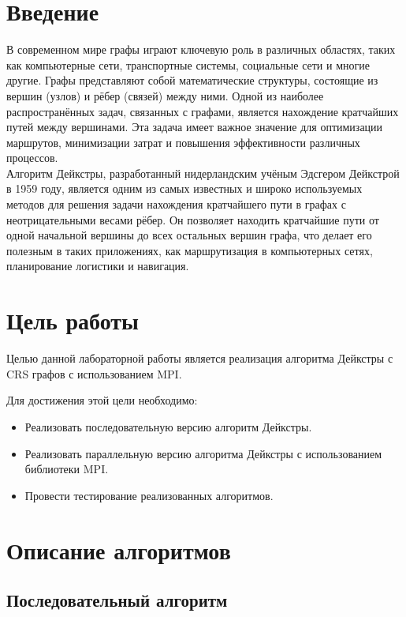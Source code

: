 \documentclass[a4paper, 14pt]{extarticle}
\begin{document}
    \tableofcontents

    \newpage
    \section{Введение}
В современном мире графы играют ключевую роль в различных областях, таких как компьютерные сети, транспортные системы, социальные сети и многие другие. Графы представляют собой математические структуры, состоящие из вершин (узлов) и рёбер (связей) между ними. Одной из наиболее распространённых задач, связанных с графами, является нахождение кратчайших путей между вершинами. Эта задача имеет важное значение для оптимизации маршрутов, минимизации затрат и повышения эффективности различных процессов.\\

Алгоритм Дейкстры, разработанный нидерландским учёным Эдсгером Дейкстрой в 1959 году, является одним из самых известных и широко используемых методов для решения задачи нахождения кратчайшего пути в графах с неотрицательными весами рёбер. Он позволяет находить кратчайшие пути от одной начальной вершины до всех остальных вершин графа, что делает его полезным в таких приложениях, как маршрутизация в компьютерных сетях, планирование логистики и навигация.
    \newpage
    \section{Цель работы}
Целью данной лабораторной работы является реализация алгоритма Дейкстры с CRS графов с использованием MPI.

Для достижения этой цели необходимо:  
\begin{itemize}
    \item Реализовать последовательную версию алгоритм Дейкстры.
    \item Реализовать параллельную версию алгоритма Дейкстры с использованием библиотеки MPI.
    \item Провести тестирование реализованных алгоритмов.
\end{itemize}  

    \newpage
    \section{Описание алгоритмов}

\subsection{Последовательный алгоритм}
\end{document}
